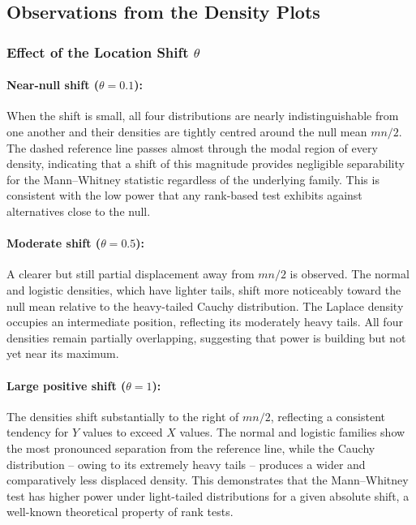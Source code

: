 \documentclass[10pt]{article}
\begin{document}
\subsection*{Observations from the Density Plots}

\subsubsection{Effect of the Location Shift $\theta$}

\paragraph{Near-null shift ($\theta = 0.1$):}
When the shift is small, all four distributions are nearly indistinguishable from
one another and their densities are tightly centred around the null mean $mn/2$.
The dashed reference line passes almost through the modal region of every density,
indicating that a shift of this magnitude provides negligible separability for the
Mann--Whitney statistic regardless of the underlying family.  This is consistent
with the low power that any rank-based test exhibits against alternatives close to
the null.

\paragraph{Moderate shift ($\theta = 0.5$):}
A clearer but still partial displacement away from $mn/2$ is observed.  The normal
and logistic densities, which have lighter tails, shift more noticeably toward the
null mean relative to the heavy-tailed Cauchy distribution.  The Laplace density
occupies an intermediate position, reflecting its moderately heavy tails.  All four
densities remain partially overlapping, suggesting that power is building but not
yet near its maximum.

\paragraph{Large positive shift ($\theta = 1$):}
The densities shift substantially to the right of $mn/2$, reflecting a consistent
tendency for $Y$ values to exceed $X$ values.  The normal and logistic families
show the most pronounced separation from the reference line, while the Cauchy
distribution -- owing to its extremely heavy tails -- produces a wider and
comparatively less displaced density.  This demonstrates that the Mann--Whitney
test has higher power under light-tailed distributions for a given absolute shift,
a well-known theoretical property of rank tests.
\end{document}
